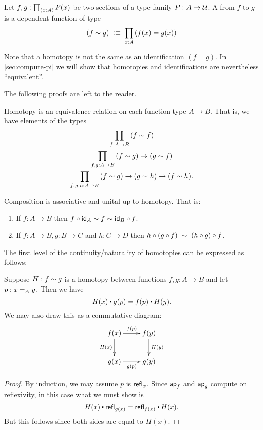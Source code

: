 \begin{defn} \label{defn:homotopy}
  Let $f,g:\prd{x:A} P(x)$ be two sections of a type family $P:A\to\type$.
  A  from $f$ to $g$ is a dependent function of type
  \begin{equation*}
    (f\htpy g)\;\defeq\; \prd{x:A} (f(x)=g(x))
  \end{equation*}
\end{defn}

Note that a homotopy is not the same as an identification $(f=g)$.
In \autoref{sec:compute-pi} we will show that homotopies and identifications are nevertheless ``equivalent''.

The following proofs are left to the reader.

\begin{lem}\label{lem:homotopy-props}
  Homotopy is an equivalence relation on each function type $A\to B$.
  That is, we have elements of the types
  \begin{gather*}
    \prd{f:A\to B} (f\htpy f)\\
    \prd{f,g:A\to B} (f\htpy g) \to (g\htpy f)\\
    \prd{f,g,h:A\to B} (f\htpy g) \to (g\htpy h) \to (f\htpy h).
  \end{gather*}
\end{lem}

\begin{lem}
  Composition is associative and unital up to homotopy.
  That is:
  \begin{enumerate}
  \item If $f:A\to B$ then $f\circ \idfunc[A]\htpy f\htpy \idfunc[B]\circ f$.
  \item If $f:A\to B, g:B\to C$ and $h:C\to D$ then $h\circ (g\circ f)\;\htpy\; (h\circ g)\circ f$.
  \end{enumerate}
\end{lem}

The first level of the continuity/naturality of homotopies can be expressed as follows:

\begin{lem}\label{lem:htpy-natural}
  Suppose $H:f\htpy g$ is a homotopy between functions $f,g:A\to B$ and let $p:\id[A]xy$.  Then we have
  \begin{equation*}
    H(x)\ct\ap{g}{p}=\ap{f}{p}\ct H(y).
  \end{equation*}
  We may also draw this as a commutative diagram:
  \begin{align*}
    \xymatrix{
      f(x) \ar[r]^{\ap fp} \ar[d]_{H(x)} & f(y) \ar[d]^{H(y)} \\
      g(x) \ar[r]_{\ap gp} & g(y)
    }
  \end{align*}
\end{lem}
\begin{proof}
  By induction, we may assume $p$ is $\refl x$.
  Since $\apfunc{f}$ and $\apfunc g$ compute on reflexivity, in this case what we must show is
  \[ H(x) \ct \refl{g(x)} = \refl{f(x)} \ct H(x). \]
  But this follows since both sides are equal to $H(x)$.
\end{proof}

